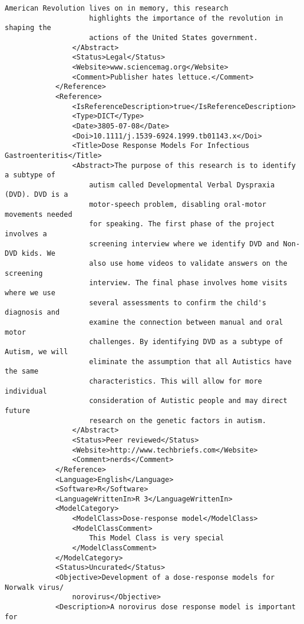 \documentclass[a4paper]{report}
\begin{document}
\begin{lstlisting}[language=RAKIP, caption={Example of StudySample}]
                    American Revolution lives on in memory, this research
                    highlights the importance of the revolution in shaping the
                    actions of the United States government.
                </Abstract>
                <Status>Legal</Status>
                <Website>www.sciencemag.org</Website>
                <Comment>Publisher hates lettuce.</Comment>
            </Reference>
            <Reference>
                <IsReferenceDescription>true</IsReferenceDescription>
                <Type>DICT</Type>
                <Date>3805-07-08</Date>
                <Doi>10.1111/j.1539-6924.1999.tb01143.x</Doi>
                <Title>Dose Response Models For Infectious Gastroenteritis</Title>
                <Abstract>The purpose of this research is to identify a subtype of
                    autism called Developmental Verbal Dyspraxia (DVD). DVD is a
                    motor-speech problem, disabling oral-motor movements needed
                    for speaking. The first phase of the project involves a
                    screening interview where we identify DVD and Non-DVD kids. We
                    also use home videos to validate answers on the screening
                    interview. The final phase involves home visits where we use
                    several assessments to confirm the child's diagnosis and
                    examine the connection between manual and oral motor
                    challenges. By identifying DVD as a subtype of Autism, we will
                    eliminate the assumption that all Autistics have the same
                    characteristics. This will allow for more individual
                    consideration of Autistic people and may direct future
                    research on the genetic factors in autism.
                </Abstract>
                <Status>Peer reviewed</Status>
                <Website>http://www.techbriefs.com</Website>
                <Comment>nerds</Comment>
            </Reference>
            <Language>English</Language>
            <Software>R</Software>
            <LanguageWrittenIn>R 3</LanguageWrittenIn>
            <ModelCategory>
                <ModelClass>Dose-response model</ModelClass>
                <ModelClassComment>
                    This Model Class is very special
                </ModelClassComment>
            </ModelCategory>
            <Status>Uncurated</Status>
            <Objective>Development of a dose-response models for Norwalk virus/
                norovirus</Objective>
            <Description>A norovirus dose response model is important for

\end{lstlisting}
\end{document}
